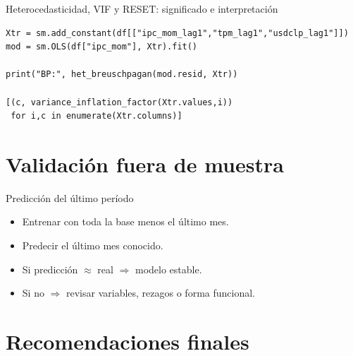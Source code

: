 \documentclass[aspectratio=169,10pt]{beamer}
\begin{document}
\begin{frame}[fragile]{Heterocedasticidad, VIF y RESET: significado e interpretación}


\begin{lstlisting}
Xtr = sm.add_constant(df[["ipc_mom_lag1","tpm_lag1","usdclp_lag1"]])
mod = sm.OLS(df["ipc_mom"], Xtr).fit()

print("BP:", het_breuschpagan(mod.resid, Xtr))

[(c, variance_inflation_factor(Xtr.values,i))
 for i,c in enumerate(Xtr.columns)]
\end{lstlisting}

\end{frame}

\section{Validación fuera de muestra}

\begin{frame}{Predicción del último período}
  \begin{itemize}
    \item Entrenar con toda la base menos el último mes.
    \item Predecir el último mes conocido.
    \item Si predicción $\approx$ real $\Rightarrow$ modelo estable.
    \item Si no $\Rightarrow$ revisar variables, rezagos o forma funcional.
  \end{itemize}
\end{frame}


\section{Recomendaciones finales}
\end{document}
